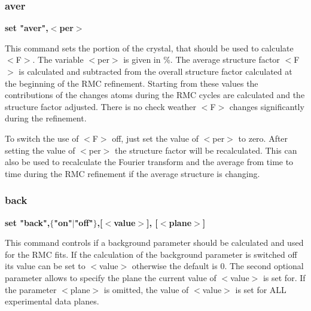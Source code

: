 \subsubsection{aver}
{\bf set "aver",$ <$per$> $ \par }
\par
\vspace{3pt}
This command sets the portion of the crystal, that should be used to 
calculate $ <$F$> $. The variable $ <$per$> $ is given in \%. The average structure 
factor $ <$F$> $ is calculated and subtracted from the overall structure 
factor calculated at the beginning of the RMC refinement. Starting 
from these values the contributions of the changes atoms during the 
RMC cycles are calculated and the structure factor adjusted. There 
is no check weather $ <$F$> $ changes significantly during the refinement. 
\par
To switch the use of $ <$F$> $ off, just set the value of $ <$per$> $ to zero. 
After setting the value of $ <$per$> $ the structure factor will be recalculated. 
This can also be used to recalculate the Fourier transform and 
the average from time to time during the RMC refinement if the 
average structure is changing. 
\subsubsection{back}
{\bf set "back",$ \{$"on"$| $"off"$\} $,[$ <$value$> $], [$ <$plane$> $] \par }
\par
\vspace{3pt}
This command controls if a background parameter should be calculated and 
used for the RMC fits. If the calculation of the background parameter 
is switched off its value can be set to $ <$value$> $ otherwise the default 
is 0. The second optional parameter allows to specify the plane the 
current value of $ <$value$> $ is set for. If the parameter $ <$plane$> $ is omitted, 
the value of $ <$value$> $ is set for ALL experimental data planes. 
